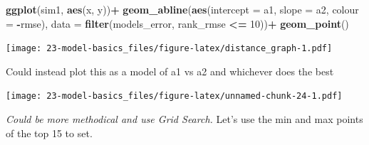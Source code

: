 \documentclass[]{book}
\newenvironment{Shaded}{\begin{snugshade}}{\end{snugshade}}
\newcommand{\CommentTok}[1]{\textcolor[rgb]{0.56,0.35,0.01}{\textit{#1}}}
\newcommand{\ControlFlowTok}[1]{\textcolor[rgb]{0.13,0.29,0.53}{\textbf{#1}}}
\newcommand{\DataTypeTok}[1]{\textcolor[rgb]{0.13,0.29,0.53}{#1}}
\newcommand{\DecValTok}[1]{\textcolor[rgb]{0.00,0.00,0.81}{#1}}
\newcommand{\KeywordTok}[1]{\textcolor[rgb]{0.13,0.29,0.53}{\textbf{#1}}}
\newcommand{\NormalTok}[1]{#1}
\newcommand{\OperatorTok}[1]{\textcolor[rgb]{0.81,0.36,0.00}{\textbf{#1}}}
\newcommand{\StringTok}[1]{\textcolor[rgb]{0.31,0.60,0.02}{#1}}
\theoremstyle{definition}
\theoremstyle{definition}
\theoremstyle{definition}
\theoremstyle{remark}
\begin{document}
\begin{Shaded}
\begin{Highlighting}[]
\KeywordTok{ggplot}\NormalTok{(sim1, }\KeywordTok{aes}\NormalTok{(x, y))}\OperatorTok{+}
\StringTok{  }\KeywordTok{geom_abline}\NormalTok{(}\KeywordTok{aes}\NormalTok{(}\DataTypeTok{intercept =}\NormalTok{ a1, }\DataTypeTok{slope =}\NormalTok{ a2, }\DataTypeTok{colour =} \OperatorTok{-}\NormalTok{rmse), }
              \DataTypeTok{data =} \KeywordTok{filter}\NormalTok{(models_error, rank_rmse }\OperatorTok{<=}\StringTok{ }\DecValTok{10}\NormalTok{))}\OperatorTok{+}
\StringTok{  }\KeywordTok{geom_point}\NormalTok{()  }
\end{Highlighting}
\end{Shaded}

\texttt{[image: 23-model-basics\_files/figure-latex/distance\_graph-1.pdf]}

Could instead plot this as a model of a1 vs a2 and whichever does the
best

\begin{Shaded}
\end{Shaded}

\texttt{[image: 23-model-basics\_files/figure-latex/unnamed-chunk-24-1.pdf]}

\emph{Could be more methodical and use Grid Search.} Let's use the min
and max points of the top 15 to set.

\begin{Shaded}
\end{Shaded}
\end{document}
